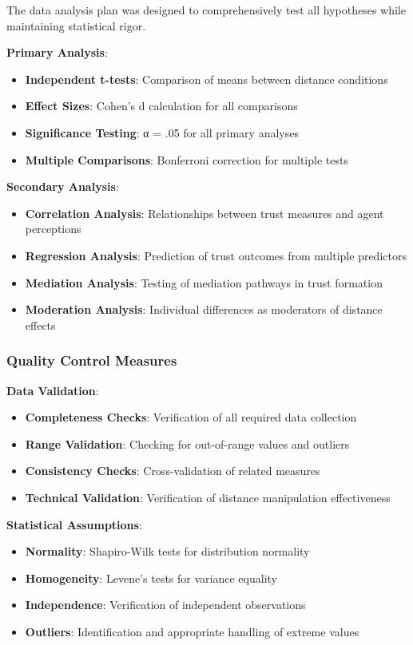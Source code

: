 \documentclass[12pt]{article}
\begin{document}
The data analysis plan was designed to comprehensively test all hypotheses while maintaining statistical rigor.

\textbf{Primary Analysis}:
\begin{itemize}
    \item \textbf{Independent t-tests}: Comparison of means between distance conditions
    \item \textbf{Effect Sizes}: Cohen's d calculation for all comparisons
    \item \textbf{Significance Testing}: α = .05 for all primary analyses
    \item \textbf{Multiple Comparisons}: Bonferroni correction for multiple tests
\end{itemize}

\textbf{Secondary Analysis}:
\begin{itemize}
    \item \textbf{Correlation Analysis}: Relationships between trust measures and agent perceptions
    \item \textbf{Regression Analysis}: Prediction of trust outcomes from multiple predictors
    \item \textbf{Mediation Analysis}: Testing of mediation pathways in trust formation
    \item \textbf{Moderation Analysis}: Individual differences as moderators of distance effects
\end{itemize}

\subsubsection{Quality Control Measures}

\textbf{Data Validation}:
\begin{itemize}
    \item \textbf{Completeness Checks}: Verification of all required data collection
    \item \textbf{Range Validation}: Checking for out-of-range values and outliers
    \item \textbf{Consistency Checks}: Cross-validation of related measures
    \item \textbf{Technical Validation}: Verification of distance manipulation effectiveness
\end{itemize}

\textbf{Statistical Assumptions}:
\begin{itemize}
    \item \textbf{Normality}: Shapiro-Wilk tests for distribution normality
    \item \textbf{Homogeneity}: Levene's tests for variance equality
    \item \textbf{Independence}: Verification of independent observations
    \item \textbf{Outliers}: Identification and appropriate handling of extreme values
\end{itemize}
\end{document}
